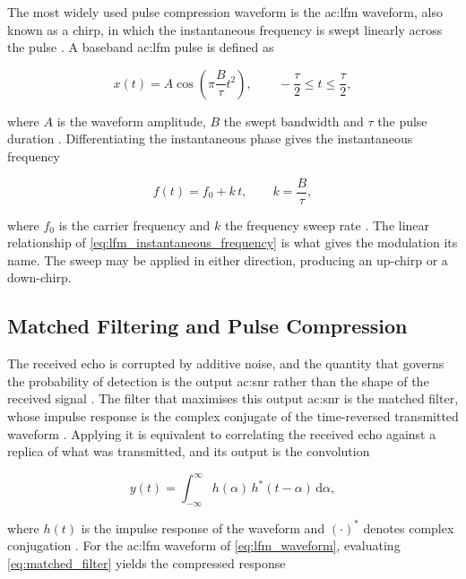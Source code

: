 The most widely used pulse compression waveform is the \gls{ac:lfm} waveform, also known as a chirp, in which the instantaneous frequency is swept linearly across the pulse \cite{pomr}. A baseband \gls{ac:lfm} pulse is defined as

\begin{equation}
  x(t) = A\cos\left(\pi\frac{B}{\tau}t^2\right),
  \qquad -\frac{\tau}{2} \leq t \leq \frac{\tau}{2},
  \label{eq:lfm_waveform}
\end{equation}

where $A$ is the waveform amplitude, $B$ the swept bandwidth and $\tau$ the pulse duration \cite{pomr}. Differentiating the instantaneous phase gives the instantaneous frequency

\begin{equation}
  f(t) = f_0 + k\,t, \qquad k = \frac{B}{\tau},
  \label{eq:lfm_instantaneous_frequency}
\end{equation}

where $f_0$ is the carrier frequency and $k$ the frequency sweep rate \cite{marthinmon}. The linear relationship of \eqref{eq:lfm_instantaneous_frequency} is what gives the modulation its name. The sweep may be applied in either direction, producing an up-chirp or a down-chirp.

\subsection{Matched Filtering and Pulse Compression}\label{sec:matched_filtering}

The received echo is corrupted by additive noise, and the quantity that governs the probability of detection is the output \gls{ac:snr} rather than the shape of the received signal \cite{marthinmon}. The filter that maximises this output \gls{ac:snr} is the matched filter, whose impulse response is the complex conjugate of the time-reversed transmitted waveform \cite{pomr}. Applying it is equivalent to correlating the received echo against a replica of what was transmitted, and its output is the convolution

\begin{equation}
  y(t) = \int_{-\infty}^{\infty} h(\alpha)\,h^{*}(t-\alpha)\,\mathrm{d}\alpha ,
  \label{eq:matched_filter}
\end{equation}

where $h(t)$ is the impulse response of the waveform and $(\cdot)^{*}$ denotes complex conjugation \cite{marthinmon}. For the \gls{ac:lfm} waveform of \eqref{eq:lfm_waveform}, evaluating \eqref{eq:matched_filter} yields the compressed response


